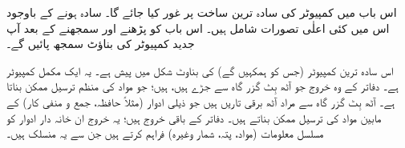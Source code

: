 اس باب میں کمپیوٹر کی سادہ ترین ساخت پر غور کیا جائے گا۔ سادہ ہونے کے باوجود اس میں   کئی   اعلٰی  تصورات شامل ہیں۔ اس باب کو پڑھنے اور   سمجھنے  کے بعد آپ جدید کمپیوٹر کی بناؤٹ سمجھ پائیں گے۔

اس سادہ  ترین کمپیوٹر  (جس کو ہمکہیں گے) کی  بناوٹ شکل  میں پیش ہے۔ یہ ایک مکمل کمپیوٹر ہے۔   دفاتر کے    وہ خروج جو آٹھ بِٹ گزر گاہ     سے جڑے ہیں،      ہیں؛  جو  مواد کی  منظم ترسیل ممکن بناتا  ہے۔ آٹھ بِٹ  گزر گاہ سے مراد آٹھ برقی تاریں ہیں جو    ذیلی ادوار (مثلاً حافظہ، جمع و منفی کار)  کے مابین مواد کی ترسیل ممکن بناتے ہیں۔ دفاتر کے باقی خروج  ہیں؛ یہ خروج   ان  خانہ دار  ادوار کو مسلسل   معلومات (مواد، پتہ، شمار وغیرہ)  فراہم کرتے ہیں جن سے یہ منسلک ہیں۔

